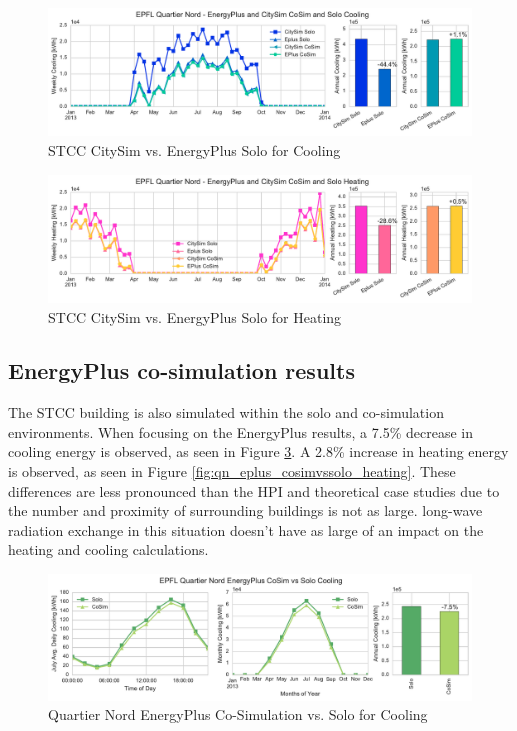 \documentclass{tBPS2e}
\theoremstyle{plain}
\theoremstyle{definition}
\theoremstyle{remark}
\begin{document}
\begin{figure}[H]
\centering
\includegraphics[scale=0.55]{figures/QN_Cooling}
\caption{STCC CitySim vs. EnergyPlus Solo for Cooling}
\label{fig:qn_eplusvscitysim_cooling}
\end{figure}

\begin{figure}[H]
\centering
\includegraphics[scale=0.55]{figures/QN_Heating.pdf}
\caption{STCC CitySim vs. EnergyPlus Solo for Heating}
\label{fig:qn_eplusvscitysim_heating}
\end{figure}


\subsection{EnergyPlus co-simulation results}
The STCC building is also simulated within the solo and
co-simulation environments. When
focusing on the EnergyPlus results, a 7.5\% decrease in cooling energy is
observed, as seen in Figure
\ref{fig:qn_eplus_cosimvssolo_cooling}. A 2.8\% increase in heating energy is
observed, as seen in Figure
\ref{fig:qn_eplus_cosimvssolo_heating}. These differences are less pronounced
than the HPI and theoretical case studies due to the number and proximity of
surrounding buildings is not as large. long-wave radiation exchange in this situation doesn't have as large of an impact on the heating and cooling calculations.


\begin{figure}[H]
\centering
\includegraphics[scale=0.55]{figures/QN_EnergyPlus_Cooling}
\caption{Quartier Nord EnergyPlus Co-Simulation vs. Solo for Cooling}
\label{fig:qn_eplus_cosimvssolo_cooling}
\end{figure}
\end{document}
